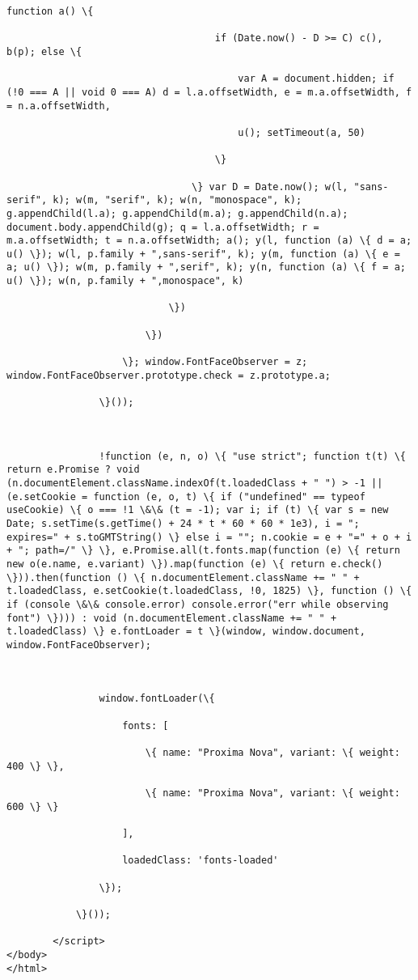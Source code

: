 \documentclass[11pt]{article}
\begin{document}
\begin{Verbatim}[commandchars=\\\{\}]
                                function a() \{

                                    if (Date.now() - D >= C) c(), b(p); else \{

                                        var A = document.hidden; if (!0 === A || void 0 === A) d = l.a.offsetWidth, e = m.a.offsetWidth, f = n.a.offsetWidth,

                                        u(); setTimeout(a, 50)

                                    \}

                                \} var D = Date.now(); w(l, "sans-serif", k); w(m, "serif", k); w(n, "monospace", k); g.appendChild(l.a); g.appendChild(m.a); g.appendChild(n.a); document.body.appendChild(g); q = l.a.offsetWidth; r = m.a.offsetWidth; t = n.a.offsetWidth; a(); y(l, function (a) \{ d = a; u() \}); w(l, p.family + ",sans-serif", k); y(m, function (a) \{ e = a; u() \}); w(m, p.family + ",serif", k); y(n, function (a) \{ f = a; u() \}); w(n, p.family + ",monospace", k)

                            \})

                        \})

                    \}; window.FontFaceObserver = z; window.FontFaceObserver.prototype.check = z.prototype.a;

                \}());



                !function (e, n, o) \{ "use strict"; function t(t) \{ return e.Promise ? void (n.documentElement.className.indexOf(t.loadedClass + " ") > -1 || (e.setCookie = function (e, o, t) \{ if ("undefined" == typeof useCookie) \{ o === !1 \&\& (t = -1); var i; if (t) \{ var s = new Date; s.setTime(s.getTime() + 24 * t * 60 * 60 * 1e3), i = "; expires=" + s.toGMTString() \} else i = ""; n.cookie = e + "=" + o + i + "; path=/" \} \}, e.Promise.all(t.fonts.map(function (e) \{ return new o(e.name, e.variant) \}).map(function (e) \{ return e.check() \})).then(function () \{ n.documentElement.className += " " + t.loadedClass, e.setCookie(t.loadedClass, !0, 1825) \}, function () \{ if (console \&\& console.error) console.error("err while observing font") \}))) : void (n.documentElement.className += " " + t.loadedClass) \} e.fontLoader = t \}(window, window.document, window.FontFaceObserver);



                window.fontLoader(\{

                    fonts: [

                        \{ name: "Proxima Nova", variant: \{ weight: 400 \} \},

                        \{ name: "Proxima Nova", variant: \{ weight: 600 \} \}

                    ],

                    loadedClass: 'fonts-loaded'

                \});

            \}());

        </script>
</body>
</html>


    \end{Verbatim}
\end{document}
